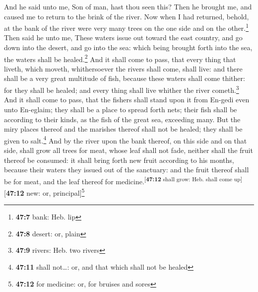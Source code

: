  And he said unto me, Son of man, hast thou seen this?
Then he brought me, and caused me to return to the brink of the river.
 Now when I had returned, behold, at the bank of the river
were very many trees on the one side and on the other.\footnote{\textbf{47:7}
  bank: Heb. lip}  Then said he unto me, These waters
issue out toward the east country, and go down into the desert, and go
into the sea: which being brought forth into the sea, the waters shall
be healed.\footnote{\textbf{47:8} desert: or, plain}  And
it shall come to pass, that every thing that liveth, which moveth,
whithersoever the rivers shall come, shall live: and there shall be a
very great multitude of fish, because these waters shall come thither:
for they shall be healed; and every thing shall live whither the river
cometh.\footnote{\textbf{47:9} rivers: Heb. two rivers} 
And it shall come to pass, that the fishers shall stand upon it from
En-gedi even unto En-eglaim; they shall be a place to spread forth nets;
their fish shall be according to their kinds, as the fish of the great
sea, exceeding many.  But the miry places thereof and the
marishes thereof shall not be healed; they shall be given to
salt.\footnote{\textbf{47:11} shall not\ldots: or, and that which shall
  not be healed}  And by the river upon the bank thereof,
on this side and on that side, shall grow all trees for meat, whose leaf
shall not fade, neither shall the fruit thereof be consumed: it shall
bring forth new fruit according to his months, because their waters they
issued out of the sanctuary: and the fruit thereof shall be for meat,
and the leaf thereof for medicine.\textsuperscript{{[}\textbf{47:12}
shall grow: Heb. shall come up{]}}{[}\textbf{47:12} new: or,
principal{]}\footnote{\textbf{47:12} for medicine: or, for bruises and
  sores}

